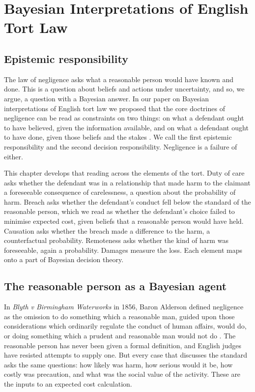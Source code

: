 \chapter{Bayesian Interpretations of English Tort Law}
\label{ch:tort}

\section{Epistemic responsibility}

The law of negligence asks what a reasonable person would have known and done. This is a question about beliefs and actions under uncertainty, and so, we argue, a question with a Bayesian answer. In our paper on Bayesian interpretations of English tort law we proposed that the core doctrines of negligence can be read as constraints on two things: on what a defendant ought to have believed, given the information available, and on what a defendant ought to have done, given those beliefs and the stakes \citep{polson_sokolov_tort}. We call the first epistemic responsibility and the second decision responsibility. Negligence is a failure of either.

This chapter develops that reading across the elements of the tort. Duty of care asks whether the defendant was in a relationship that made harm to the claimant a foreseeable consequence of carelessness, a question about the probability of harm. Breach asks whether the defendant's conduct fell below the standard of the reasonable person, which we read as whether the defendant's choice failed to minimise expected cost, given beliefs that a reasonable person would have held. Causation asks whether the breach made a difference to the harm, a counterfactual probability. Remoteness asks whether the kind of harm was foreseeable, again a probability. Damages measure the loss. Each element maps onto a part of Bayesian decision theory.

\section{The reasonable person as a Bayesian agent}

In \emph{Blyth v Birmingham Waterworks} in 1856, Baron Alderson defined negligence as the omission to do something which a reasonable man, guided upon those considerations which ordinarily regulate the conduct of human affairs, would do, or doing something which a prudent and reasonable man would not do \citep{blyth1856}. The reasonable person has never been given a formal definition, and English judges have resisted attempts to supply one. But every case that discusses the standard asks the same questions: how likely was harm, how serious would it be, how costly was precaution, and what was the social value of the activity. These are the inputs to an expected cost calculation.

